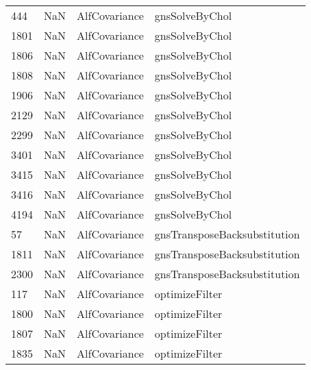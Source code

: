 \begin{tabular}{llll}
444  &                   NaN &              AlfCovariance &                            gnsSolveByChol \\
1801 &                   NaN &              AlfCovariance &                            gnsSolveByChol \\
1806 &                   NaN &              AlfCovariance &                            gnsSolveByChol \\
1808 &                   NaN &              AlfCovariance &                            gnsSolveByChol \\
1906 &                   NaN &              AlfCovariance &                            gnsSolveByChol \\
2129 &                   NaN &              AlfCovariance &                            gnsSolveByChol \\
2299 &                   NaN &              AlfCovariance &                            gnsSolveByChol \\
3401 &                   NaN &              AlfCovariance &                            gnsSolveByChol \\
3415 &                   NaN &              AlfCovariance &                            gnsSolveByChol \\
3416 &                   NaN &              AlfCovariance &                            gnsSolveByChol \\
4194 &                   NaN &              AlfCovariance &                            gnsSolveByChol \\
57   &                   NaN &              AlfCovariance &              gnsTransposeBacksubstitution \\
1811 &                   NaN &              AlfCovariance &              gnsTransposeBacksubstitution \\
2300 &                   NaN &              AlfCovariance &              gnsTransposeBacksubstitution \\
117  &                   NaN &              AlfCovariance &                            optimizeFilter \\
1800 &                   NaN &              AlfCovariance &                            optimizeFilter \\
1807 &                   NaN &              AlfCovariance &                            optimizeFilter \\
1835 &                   NaN &              AlfCovariance &                            optimizeFilter \\

\end{tabular}
